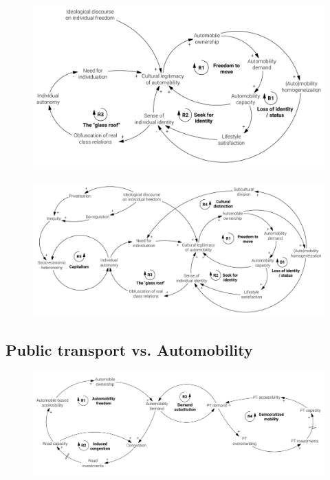 \begin{figure}[h]
\centering
\includegraphics[width=\textwidth]{figures/model/cropped/cultural_2_class-relations.pdf}
\label{f:results:cld_culture_2}
\caption[]{}
\end{figure}

\begin{figure}
\includegraphics[width=1.2\textwidth,center]{figures/model/cropped/cultural_3_final.pdf}
\label{f:results:cld_culture_3}
\caption[]{}
\end{figure}

\subsection{Public transport vs. Automobility}
\label{ss:results:cld_public-transport-automobility}

\begin{figure}[h]
\includegraphics[width=1.1\textwidth,center]{figures/model/cropped/public-transport_1_core.pdf}
\label{f:results:cld_pt_1}
\caption[]{}
\end{figure}

